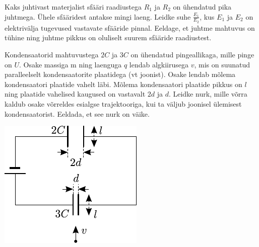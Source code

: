 \documentclass[10pt]{article}
\begin{document}
{%

Kaks juhtivast materjalist sfääri raadiustega $R_1$ ja $R_2$ on ühendatud pika 
juhtmega. Ühele sfääridest antakse mingi laeng. Leidke suhe $\frac{E_1}{E_2}$, kus
$E_1$ ja $E_2$ on elektrivälja tugevused vastavate sfääride pinnal. Eeldage, et
juhtme mahtuvus on tühine ning juhtme pikkus on oluliselt suurem sfääride
raadiustest.
\probend
\newpage

\bigskip


Kondensaatorid mahtuvustega $2C$ ja $3C$ on ühendatud pingeallikaga, mille pinge on $U$. Osake massiga m ning laenguga $q$ lendab algkiirusega $v$, mis on suunatud paralleelselt kondensaatorite plaatidega (vt joonist). Osake lendab mõlema kondensaatori plaatide vahelt läbi. Mõlema kondensaatori plaatide pikkus on $l$ ning plaatide vahelised kaugused on vastavalt $2d$ ja $d$. Leidke nurk, mille võrra kaldub osake võrreldes esialgse trajektooriga, kui ta väljub joonisel ülemisest kondensaatorist. Eeldada, et see nurk on väike.

\begin{center}
	\includegraphics[width=0.6\linewidth]{2005-v3g-08-yl}
\end{center}
\probend
\bigskip


}
\end{document}
